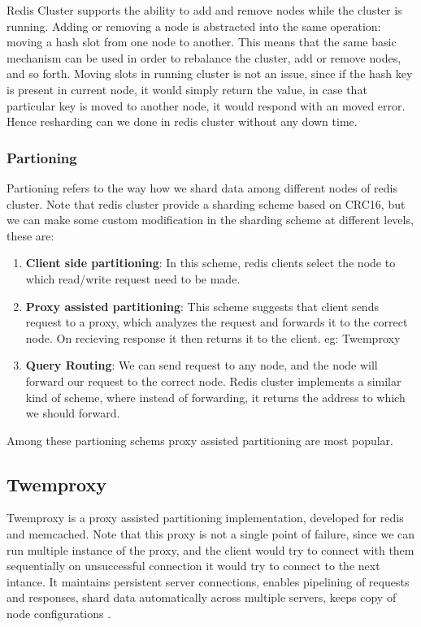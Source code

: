 \documentclass[11pt]{article}
\begin{document}
Redis Cluster supports the ability to add and remove nodes while the
cluster is running. Adding or removing a node is abstracted into
the same operation: moving a hash slot from one node to another. This
means that the same basic mechanism can be used in order to rebalance the
cluster, add or remove nodes, and so forth. Moving slots in running cluster 
is not an issue, since if the hash key is present in current node, it would simply 
return the value, in case that particular key is moved to another node, it would
respond with an moved error. Hence resharding can we done in redis cluster without
any down time.

\subsubsection*{Partioning}
Partioning refers to the way how we shard data among
different nodes of redis cluster. Note that redis cluster provide a 
sharding scheme based on CRC16, but we can make some custom modification in the sharding
scheme at different levels, these are:
\begin{enumerate}
    \item \textbf{Client side partitioning}: In this scheme, redis clients select the
        node to which read/write request need to be made.
    \item \textbf{Proxy assisted partitioning}: This scheme suggests that client sends
        request to a proxy, which analyzes the request and forwards it to the correct node.
        On recieving response it then returns it to the client. eg: Twemproxy
    \item \textbf{Query Routing}: We can send request to any node, and the node will
        forward our request to the correct node. Redis cluster implements a similar kind of
        scheme, where instead of forwarding, it returns the address to which we should forward.
\end{enumerate}
Among these partioning schems proxy assisted partitioning are most popular.

\subsection*{Twemproxy}
Twemproxy is a proxy assisted partitioning implementation, developed for redis and memcached.
Note that this proxy is not a single point of failure, since we can run multiple
instance of the proxy, and the client would try to connect with them sequentially
on unsuccessful connection it would try to connect to the next intance.
It maintains persistent server connections, enables pipelining of
requests and responses, shard data automatically across multiple servers, keeps copy
of node configurations \cite{twem}.
\\
\end{document}
